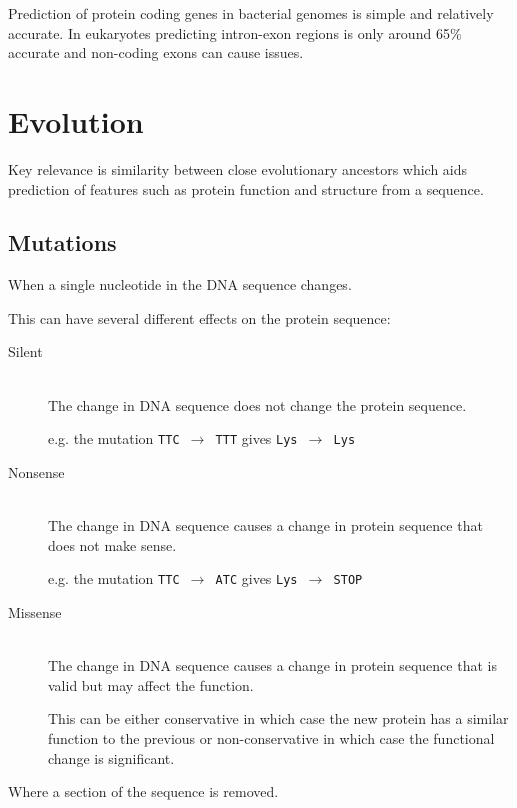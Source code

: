 \documentclass[a4paper]{article}
\begin{document}
Prediction of protein coding genes in bacterial genomes is simple and relatively
accurate. In eukaryotes predicting intron-exon regions is only around 65\%
accurate and non-coding exons can cause issues.

\section{Evolution}

Key relevance is similarity between close evolutionary ancestors which aids
prediction of features such as protein function and structure from a sequence.

\subsection{Mutations}


When a single nucleotide in the DNA sequence changes.

This can have several different effects on the protein sequence:

\begin{description}
  \item[Silent] \hfill \\
    The change in DNA sequence does not change the protein sequence.

    e.g. the mutation \texttt{TTC $\rightarrow$ TTT} gives
    \texttt{Lys $\rightarrow$ Lys}

  \item[Nonsense] \hfill \\
    The change in DNA sequence causes a change in protein sequence that does not
    make sense.

    e.g. the mutation \texttt{TTC $\rightarrow$ ATC} gives
    \texttt{Lys $\rightarrow$ STOP}

  \item[Missense] \hfill \\
    The change in DNA sequence causes a change in protein sequence that is valid
    but may affect the function.

    This can be either conservative in which case the new protein has a similar
    function to the previous or non-conservative in which case the functional
    change is significant.

\end{description}


Where a section of the sequence is removed.
\end{document}
